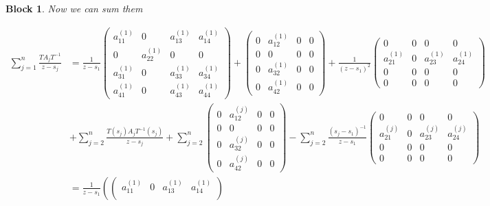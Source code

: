 \documentclass[12pt]{article}
\newtheorem{block}{Block}
\begin{document}
\begin{block}
Now we can sum them


\[
\begin{aligned}
    \sum_{j=1}^{n}\frac{T A_j T^{-1}}{z-s_j} &=
    \frac{1}{z-s_1}
    \begin{pmatrix}
        a_{11}^{(1)} & 0 & a_{13}^{(1)} & a_{14}^{(1)} \\[10pt]
        0 & a_{22}^{(1)} & 0 & 0\\[10pt]
        a_{31}^{(1)} & 0 & a_{33}^{(1)} & a_{34}^{(1)} \\[10pt]
        a_{41}^{(1)} & 0 & a_{43}^{(1)} & a_{44}^{(1)}
    \end{pmatrix}
    +\begin{pmatrix}
        0 & a_{12}^{(1)} & 0 & 0 \\[10pt]
        0 & 0 & 0 & 0 \\[10pt]
        0 & a_{32}^{(1)} & 0 & 0 \\[10pt]
        0 & a_{42}^{(1)} & 0 & 0
    \end{pmatrix}
    +\frac{1}{(z-s_1)^2}
    \begin{pmatrix}
        0 & 0 & 0 & 0 \\[10pt]
        a_{21}^{(1)} & 0 & a_{23}^{(1)}  & a_{24}^{(1)}\\[10pt]
        0 & 0 & 0 & 0 \\[10pt]
        0 & 0 & 0 & 0
    \end{pmatrix}
    \\[10pt] &
    +\sum_{j=2}^{n} \frac{T(s_j) A_{j} T^{-1}(s_j)}{z-s_j}
    + \sum_{j=2}^{n} \begin{pmatrix}
        0 & a_{12}^{(j)} & 0 & 0 \\[10pt]
        0 & 0 & 0 & 0 \\[10pt]
        0 & a_{32}^{(j)} & 0 & 0 \\[10pt]
        0 & a_{42}^{(j)} & 0 & 0
    \end{pmatrix}
    -\sum_{j=2}^{n} \frac{(s_j-s_1)^{-1}}{z-s_1}
    \begin{pmatrix}
        0 & 0 & 0 & 0 \\[10pt]
        a_{21}^{(j)} & 0 & a_{23}^{(j)}  & a_{24}^{(j)}\\[10pt]
        0 & 0 & 0 & 0 \\[10pt]
        0 & 0 & 0 & 0
    \end{pmatrix}
    \\[10pt] & =
    \frac{1}{z-s_1}\left(
        \begin{pmatrix}
            a_{11}^{(1)} & 0 & a_{13}^{(1)} & a_{14}^{(1)} \\[10pt]

\end{pmatrix}
\end{aligned}\]
\end{block}
\end{document}
